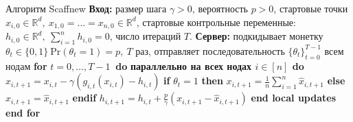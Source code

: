 \documentclass[russian,xcolor=dvipsnames]{beamer}
\begin{document}
\begin{frame}{Алгоритм Scaffnew}
\textbf{Вход:} размер шага $\gamma > 0$, вероятность $p>0$, стартовые точки $x_{i,0} \in \mathbb{R}^d,\ x_{1,0}=\dots=x_{n,0} \in \mathbb{R}^d$, стартовые контрольные переменные: $h_{i, 0} \in \mathbb{R}^d,\ \sum\limits_{i=1}^n h_{i,0} = 0$, число итераций $T$. \newline
\textbf{Сервер:} подкидывает монетку $\theta_t \in \{0, 1\}\ \text{Pr}(\theta_t = 1) = p,\ T$ раз, отправляет последовательность $\{\theta_t\}_{t=0}^{T-1}$ всем нодам \newline
\textbf{for} $t=0,\dots, T-1\ $ \textbf{do} \newline
\hspace*{4} \textbf{параллельно на всех нодах $i \in [n]$ do}
\hspace*{8} $\hat x_{i, t+1} = x_{i,t} - \gamma(g_{i,t}(x_{i,t}) - h_{i,t})$ \newline
\hspace*{8} \textbf{if} $\theta_t = 1$ \textbf{then} $x_{i,t+1} = \frac1n \sum\limits_{i=1}^n \hat x_{i,t+1}$ \newline
\hspace*{8} \textbf{else} $x_{i,t+1} = \hat x_{i,t+1}$
\hspace*{8} \textbf{endif} \newline
\hspace*{8} $h_{i,t+1} = h_{i,t} + \frac{p}{\gamma}(x_{i,t+1} - \hat x_{i,t+1})$ \newline
\hspace*{4} \textbf{end local updates} \newline
\textbf{end for}

\end{frame}

\begin{frame}{Сходимость Scaffnew}
     \texttt{[image:  \{./Scaffnew.png]}}
\end{frame}

\begin{frame}{Сходимость Scaffnew при разных значениях $p$}
     \texttt{[image:  \{./ScaffnewFunc.png]}}
\end{frame}

\begin{frame}{Сходимость Scaffnew при разных значениях $p$}
     \texttt{[image:  \{./ScaffnewDifferentPs.png]}}
\end{frame}
\end{document}
